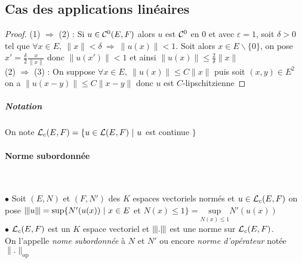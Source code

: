 		 
	\subsection{Cas des applications linéaires}
		
		
		\begin{proof}
		{\small (1)} $\Rightarrow$ {\small (2)} : Si $u\in {\mathcal{C}}^0 (E,F)$ alors $u$ est ${\mathcal{C}}^0$ en $0$ et avec $\varepsilon = 1$, soit $\delta >0$ tel que $\forall x\in E , ~\| x \| < \delta ~\Rightarrow ~\| u(x) \| < 1$. Soit alors $x\in E\backslash \{0\}$, on pose $x' = \frac{\delta}{2}\frac{x}{\| x \|}$ donc $\| u(x' ) \| <1$ et ainsi 
		$\| u(x) \| \leq \frac{2}{\delta} \| x \|$ \medskip \\ 
		{\small (2)} $\Rightarrow$ {\small (3)} : On suppose $\forall x\in E , ~\| u(x) \| \leq C\| x \| $ puis soit $(x,y) \in E^2$ 
		\\ on a $\| u(x-y) \| \leq C \| x-y \|$ donc $u$ est $C$-lipschitzienne
		\end{proof} \medskip
		
		\subparagraph{Notation}
			On note ${\mathcal{L}}_c (E,F) = \{u\in {\mathcal{L}} (E,F) ~|~u$ est continue $\}$ 
		
		\traitd 
		\paragraph{Norme subordonnée} ~ \vspace{5pt} \\
			\hspace*{15pt} {\vrule width 1pt} \kern2pt
			\begin{minipage}{0.9\textwidth}
				$\bullet$ Soit $(E,N)$ et $(F,N' )$ des $K$ espaces vectoriels normés et $u\in {\mathcal{L}}_c (E,F)$ on pose ${\left\vert\kern-0.15ex\left\vert\kern-0.15ex\left\vert u \right\vert\kern-0.15ex\right\vert\kern-0.15ex\right\vert} = \mathrm{sup} \{N' (u(x)) ~|~x\in E$ et $N(x) \leq 1 \} = \underset{N(x)\leq 1}{\mathrm{sup}} N' (u(x))$\\
				$\bullet$ ${\mathcal{L}}_c (E,F)$ est un $K$ espace vectoriel et ${\left\vert\kern-0.15ex\left\vert\kern-0.15ex\left\vert . \right\vert\kern-0.15ex\right\vert\kern-0.15ex\right\vert}$ est une norme sur ${\mathcal{L}}_c (E,F)$. \\ 
				On l'appelle \emph{nome subordonnée} à $N$ et $N'$ ou encore \emph{norme d'opérateur} notée $\| . \|_{\mathrm{op}}$ 
			\end{minipage} ~\\
			
